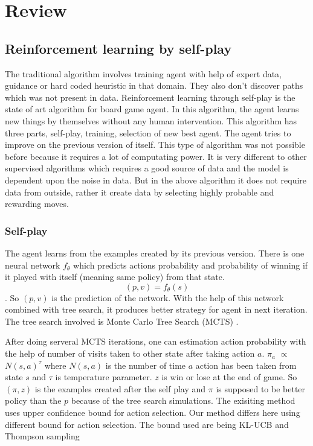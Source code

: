 \chapter{Review}

\section{Reinforcement learning by self-play}
The traditional algorithm involves training agent with help of expert data, guidance or hard coded heuristic in that domain. They also don't discover paths which was not present in data. Reinforcement learning through self-play \cite{alphagozero} is the state of art algorithm for board game agent. In this algorithm, the agent learns new things by themselves without any human intervention. This algorithm has three parts, self-play, training, selection of new best agent. The agent tries to improve on the previous version of itself. This type of algorithm was not possible before because it requires a lot of computating power. It is very different to other supervised algorithms which requires a good source of data and the model is dependent upon the noise in data. But in the above algorithm it does not require data from outside, rather it create data by selecting highly probable and rewarding moves.


\subsection{Self-play}
The agent learns from the examples created by its previous version. There is one neural network $f_{\theta}$ which predicts actions probability and probability of winning if it played with itself (meaning same policy) from that state. $$ (p,v) = f_{\theta}(s) $$. So $(p,v)$ is the prediction of the network. With the help of this network combined with tree search, it produces better strategy for agent in next iteration. The tree search involved is Monte Carlo Tree Search (MCTS) \cite{alphagozero}.


After doing serveral MCTS iterations, one can estimation action probability with the help of number of visits taken to other state after taking action $a$.
$ \pi_{a} $ $ \propto $ $N(s,a)^{\tau}$ where $N(s,a)$ is the number of time $a$ action has been taken from state $s$ and $\tau$ is temperature parameter. $z$ is win or lose at the end of game. So $(\pi,z)$ is the examples created after the self play and $\pi$ is supposed to be better policy than the $p$ because of the tree search simulations.
The exisiting method uses upper confidence bound for action selection. Our method differs here using different bound for action selection. The bound used are being KL-UCB \cite{klucb} and Thompson sampling \cite{thompson}
